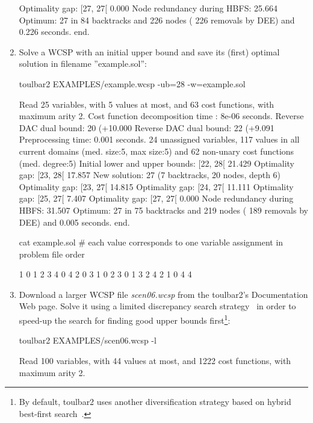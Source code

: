 \begin{enumerate}
{\begin{DoxyCode}
Optimality gap: [27, 27[ 0.000 %
Node redundancy during HBFS: 25.664 %
Optimum: 27 in 84 backtracks and 226 nodes ( 226 removals by DEE) and 0.226 seconds.
end.
\end{DoxyCode}}
\item Solve a WCSP with an initial upper bound and save its (first) optimal solution
in filename ''example.sol'':
\begin{DoxyCode}
	toulbar2 EXAMPLES/example.wcsp -ub=28 -w=example.sol
\end{DoxyCode}
{\scriptsize
\begin{DoxyCode}
Read 25 variables, with 5 values at most, and 63 cost functions, with maximum arity 2.
Cost function decomposition time : 8e-06 seconds.
Reverse DAC dual bound: 20 (+10.000%
Reverse DAC dual bound: 22 (+9.091%
Preprocessing time: 0.001 seconds.
24 unassigned variables, 117 values in all current domains (med. size:5, max size:5) and 62 non-unary cost functions (med. degree:5)
Initial lower and upper bounds: [22, 28[ 21.429%
Optimality gap: [23, 28[ 17.857 %
New solution: 27 (7 backtracks, 20 nodes, depth 6)
Optimality gap: [23, 27[ 14.815 %
Optimality gap: [24, 27[ 11.111 %
Optimality gap: [25, 27[ 7.407 %
Optimality gap: [27, 27[ 0.000 %
Node redundancy during HBFS: 31.507 %
Optimum: 27 in 75 backtracks and 219 nodes ( 189 removals by DEE) and 0.005 seconds.
end.
\end{DoxyCode}}
\begin{DoxyCode}
cat example.sol
# each value corresponds to one variable assignment in problem file order
\end{DoxyCode}
{\scriptsize
\begin{DoxyCode}
1 0 1 2 3 4 0 4 2 0 3 1 0 2 3 0 1 3 2 4 2 1 0 4 4
\end{DoxyCode}}
\item Download a larger WCSP file {\em scen06.wcsp} from the toulbar2's Documentation Web page. Solve it using a limited discrepancy search strategy~\cite{Ginsberg95} in order to speed-up the search for finding good upper bounds first\footnote{By default, toulbar2 uses another diversification strategy based on hybrid best-first search~\cite{Katsirelos15a}.}:
\begin{DoxyCode}
	toulbar2 EXAMPLES/scen06.wcsp -l
\end{DoxyCode}
{\scriptsize
\begin{DoxyCode}
Read 100 variables, with 44 values at most, and 1222 cost functions, with maximum arity 2.

\end{DoxyCode}}
\end{enumerate}
